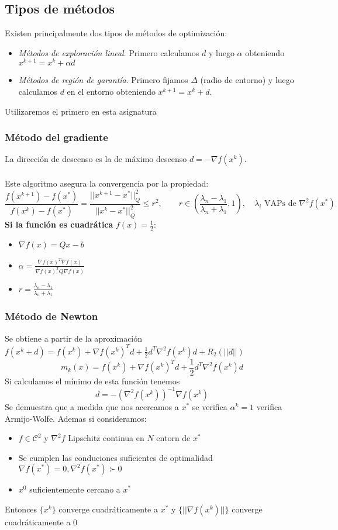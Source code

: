 \documentclass{myclass}
\newcommand{\norm}[1]{\lvert \lvert #1 \rvert \rvert }
\newcommand{\N}{\nabla}
\begin{document}
\subsection{Tipos de métodos}
Existen principalmente dos tipos de métodos de optimización:
\begin{itemize}
    \item \textit{Métodos de exploración lineal}. Primero calculamos $d$ y luego $\alpha $ obteniendo $x^{k+1} = x^{k} + \alpha d$
    \item \textit{Métodos de región de garantía}. Primero fijamos $\Delta$ (radio de entorno) y luego calculamos $d$ en el entorno obteniendo $x^{k+1} = x^k + d$.
\end{itemize}
Utilizaremos el primero en esta asignatura

\subsubsection{Método del gradiente}
La dirección de descenso es la de máximo descenso $d = -\N f(x^k)$.\\
\\
Este algoritmo asegura la convergencia por la propiedad:
$$
\frac{f(x^{k+1}) - f(x^*)}{f(x^{k}) - f(x^*)} = \frac{\norm{x^{k+1}-x^*}^2_Q}{\norm{x^{k}-x^*}^2_Q} \leq r^2 , \qquad r \in \left( \frac{\lambda_n - \lambda_1}{\lambda_n + \lambda_1}, 1 \right), \quad \lambda_i \text{ VAPs de } \N^2 f(x^*)
$$
\textbf{Si la función es cuadrática} $f(x) = \frac{1}{2}$:
\begin{itemize}
\item $\N f(x) = Qx - b$
\item $\displaystyle \alpha = \frac{\N f(x)^T \N f(x)}{\N f(x)^TQ\N f(x)}$
\item $r = \displaystyle \frac{\lambda_n - \lambda_1}{\lambda_n + \lambda_1}$ 
\end{itemize}



\subsubsection{Método de Newton}
Se obtiene a partir de la aproximación $f(x^k + d) = f(x^k) + \N f(x^k)^Td + \frac{1}{2}d^T\N^2f(x^k)d + R_2(\norm{d})$
$$
m_k(x) = f(x^k) + \N f(x^k)^Td + \frac{1}{2}d^T\N^2f(x^k)d
$$
Si calculamos el mínimo de esta función tenemos
$$
d = -(\N^2f(x^k))^{-1}\N f(x^k)
$$
Se demuestra que a medida que nos acercamos a $x^*$ se verifica $\alpha^k=1$ verifica Armijo-Wolfe. Ademas si consideramos:
\begin{itemize}
    \item $f\in \mathcal{C}^2$ y $\N^2 f$ Lipschitz continua en $N$ entorn de $x^*$
    \item Se cumplen las conduciones suficientes de optimalidad $\N f(x^*)=0, \N^2 f(x^*)\succ 0$
    \item $x^0$ suficientemente cercano a $x^*$
\end{itemize}
Entonces $\{x^k\}$ converge cuadráticamente a $x^*$ y $\{\norm{\N f(x^k)}\}$ converge cuadráticamente a $0$
\end{document}
